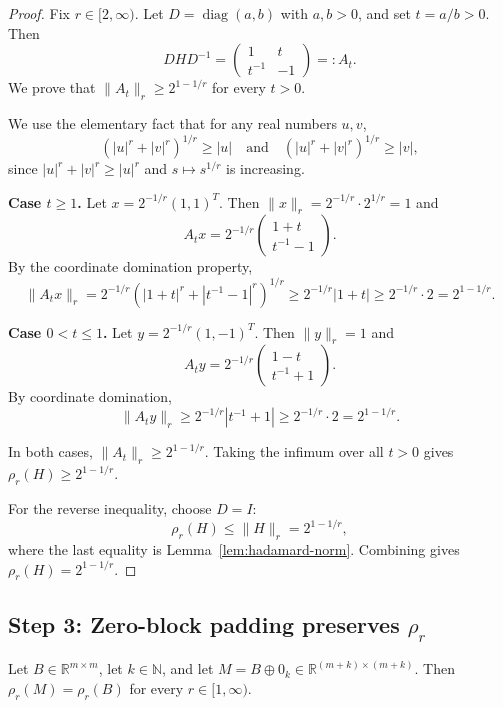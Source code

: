 \documentclass{article}
\begin{document}
\begin{proof}
Fix $r \in [2,\infty)$. Let $D=\operatorname{diag}(a,b)$ with $a,b>0$, and set $t=a/b>0$. Then
\[
DHD^{-1} = \begin{pmatrix} 1 & t \\ t^{-1} & -1 \end{pmatrix} =: A_t.
\]
We prove that $\|A_t\|_r \geq 2^{1-1/r}$ for every $t>0$.

We use the elementary fact that for any real numbers $u,v$,
\[
(|u|^r+|v|^r)^{1/r} \geq |u| \quad\text{and}\quad (|u|^r+|v|^r)^{1/r} \geq |v|,
\]
since $|u|^r+|v|^r \geq |u|^r$ and $s \mapsto s^{1/r}$ is increasing.

\textbf{Case $t\geq 1$.} Let $x=2^{-1/r}(1,1)^T$. Then $\|x\|_r = 2^{-1/r}\cdot 2^{1/r} = 1$ and
\[
A_t x = 2^{-1/r}\begin{pmatrix} 1+t \\ t^{-1}-1 \end{pmatrix}.
\]
By the coordinate domination property,
\[
\|A_t x\|_r = 2^{-1/r}(|1+t|^r+|t^{-1}-1|^r)^{1/r} \geq 2^{-1/r}|1+t| \geq 2^{-1/r}\cdot 2 = 2^{1-1/r}.
\]

\textbf{Case $0<t\leq 1$.} Let $y=2^{-1/r}(1,-1)^T$. Then $\|y\|_r = 1$ and
\[
A_t y = 2^{-1/r}\begin{pmatrix} 1-t \\ t^{-1}+1 \end{pmatrix}.
\]
By coordinate domination,
\[
\|A_t y\|_r \geq 2^{-1/r}|t^{-1}+1| \geq 2^{-1/r}\cdot 2 = 2^{1-1/r}.
\]

In both cases, $\|A_t\|_r \geq 2^{1-1/r}$. Taking the infimum over all $t>0$ gives $\rho_r(H)\geq 2^{1-1/r}$.

For the reverse inequality, choose $D=I$:
\[
\rho_r(H) \leq \|H\|_r = 2^{1-1/r},
\]
where the last equality is Lemma~\ref{lem:hadamard-norm}. Combining gives $\rho_r(H)=2^{1-1/r}$.
\end{proof}

\subsection*{Step 3: Zero-block padding preserves $\rho_r$}

\begin{lemma}\label{lem:zero-padding}
Let $B \in \mathbb{R}^{m \times m}$, let $k \in \mathbb{N}$, and let $M = B \oplus 0_k \in \mathbb{R}^{(m+k)\times(m+k)}$. Then $\rho_r(M)=\rho_r(B)$ for every $r \in [1,\infty)$.
\end{lemma}
\end{document}

